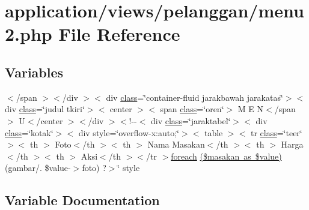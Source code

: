 \hypertarget{pelanggan_2menu2_8php}{}\section{application/views/pelanggan/menu2.php File Reference}
\label{pelanggan_2menu2_8php}
\subsection*{Variables}
\begin{DoxyCompactItemize}
\item 
$<$/span $>$$<$/div $>$$<$ div \mbox{\hyperlink{waiter_2olaporan_8php_a185c73c6507391d1eb38c776b68ce96d}{class}}=\char`\"{}container-\/fluid jarakbawah jarakatas\char`\"{}$>$$<$ div \mbox{\hyperlink{waiter_2olaporan_8php_a185c73c6507391d1eb38c776b68ce96d}{class}}=\char`\"{}judul tkiri\char`\"{}$>$$<$ center $>$$<$ span \mbox{\hyperlink{waiter_2olaporan_8php_a185c73c6507391d1eb38c776b68ce96d}{class}}=\char`\"{}oren\char`\"{}$>$ M E N$<$/span $>$ U$<$/center $>$$<$/div $>$$<$!-\/-\/$<$ div \mbox{\hyperlink{waiter_2olaporan_8php_a185c73c6507391d1eb38c776b68ce96d}{class}}=\char`\"{}jaraktabel\char`\"{}$>$$<$ div \mbox{\hyperlink{waiter_2olaporan_8php_a185c73c6507391d1eb38c776b68ce96d}{class}}=\char`\"{}kotak\char`\"{}$>$$<$ div style=\char`\"{}overflow-\/x\+:auto;\char`\"{}$>$$<$ table $>$$<$ tr \mbox{\hyperlink{waiter_2olaporan_8php_a185c73c6507391d1eb38c776b68ce96d}{class}}=\char`\"{}teer\char`\"{}$>$$<$ th $>$ Foto$<$/th $>$$<$ th $>$ Nama Masakan$<$/th $>$$<$ th $>$ Harga$<$/th $>$$<$ th $>$ Aksi$<$/th $>$$<$/tr $>$\mbox{\hyperlink{pdetailorder_8php_a2e23c42e9b59be6e2bbc1bac76422d34}{foreach}} \mbox{\hyperlink{pelanggan_2menu2_8php_ada3d9502b1388bbb5867f1e13e056e1c}{(\$masakan as \$value)}} (\textquotesingle{}gambar/\textquotesingle{}. \$value-\/$>$foto) ?$>$\char`\"{} style
\end{DoxyCompactItemize}


\subsection{Variable Documentation}
\mbox{\label{pelanggan_2menu2_8php_ada3d9502b1388bbb5867f1e13e056e1c}} 
